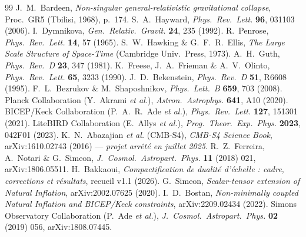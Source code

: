 \documentclass[11pt,a4paper]{article}
\theoremstyle{plain}
\theoremstyle{remark}
\begin{document}
\begin{thebibliography}{99}\small
{} J.\ M.\ Bardeen, \textit{Non-singular general-relativistic gravitational collapse}, Proc.\ GR5 (Tbilisi, 1968), p.\ 174.
 S.\ A.\ Hayward, \textit{Phys.\ Rev.\ Lett.} \textbf{96}, 031103 (2006).
 I.\ Dymnikova, \textit{Gen.\ Relativ.\ Gravit.} \textbf{24}, 235 (1992).
 R.\ Penrose, \textit{Phys.\ Rev.\ Lett.} \textbf{14}, 57 (1965).
 S.\ W.\ Hawking \& G.\ F.\ R.\ Ellis, \textit{The Large Scale Structure of Space-Time} (Cambridge Univ.\ Press, 1973).
 A.\ H.\ Guth, \textit{Phys.\ Rev.\ D} \textbf{23}, 347 (1981).
 K.\ Freese, J.\ A.\ Frieman \& A.\ V.\ Olinto, \textit{Phys.\ Rev.\ Lett.} \textbf{65}, 3233 (1990).
 J.\ D.\ Bekenstein, \textit{Phys.\ Rev.\ D} \textbf{51}, R6608 (1995).
 F.\ L.\ Bezrukov \& M.\ Shaposhnikov, \textit{Phys.\ Lett.\ B} \textbf{659}, 703 (2008).
 Planck Collaboration (Y.\ Akrami \textit{et al.}), \textit{Astron.\ Astrophys.} \textbf{641}, A10 (2020).
 BICEP/Keck Collaboration (P.\ A.\ R.\ Ade \textit{et al.}), \textit{Phys.\ Rev.\ Lett.} \textbf{127}, 151301 (2021).
 LiteBIRD Collaboration (E.\ Allys \textit{et al.}), \textit{Prog.\ Theor.\ Exp.\ Phys.} \textbf{2023}, 042F01 (2023).
 K.\ N.\ Abazajian \textit{et al.} (CMB-S4), \textit{CMB-S4 Science Book}, arXiv:1610.02743 (2016) --- \emph{projet arr\^et\'e en juillet 2025}.
 R.\ Z.\ Ferreira, A.\ Notari \& G.\ Simeon, \textit{J.\ Cosmol.\ Astropart.\ Phys.} \textbf{11} (2018) 021, arXiv:1806.05511.
 H.\ Bakkaoui, \textit{Compactification de dualit\'e d'\'echelle : cadre, corrections et r\'esultats}, recueil v1.1 (2026).
 G.\ Simeon, \textit{Scalar-tensor extension of Natural Inflation}, arXiv:2002.07625 (2020).
 I.\ D.\ Bostan, \textit{Non-minimally coupled Natural Inflation and BICEP/Keck constraints}, arXiv:2209.02434 (2022).
 Simons Observatory Collaboration (P.\ Ade \textit{et al.}), \textit{J.\ Cosmol.\ Astropart.\ Phys.} \textbf{02} (2019) 056, arXiv:1808.07445.
\end{thebibliography}
\end{document}
